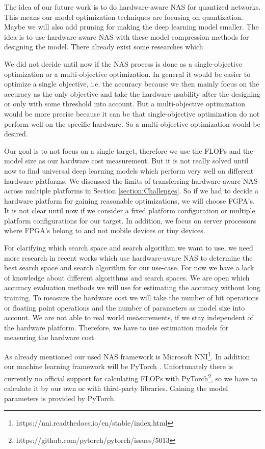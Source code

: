 \documentclass[conference]{IEEEtran}
\begin{document}
The idea of our future work is to do hardware-aware NAS for quantized networks. This means our model optimization techniques are focusing on quantization. Maybe we will also add pruning for making the deep learning model smaller. The idea is to use hardware-aware NAS with these model compression methods for designing the model. There already exist some researches which 

We did not decide until now if the NAS process is done as a single-objective optimization or a multi-objective optimization. In general it would be easier to optimize a single objective, i.e. the accuracy because we then mainly focus on the accuracy as the only objective and take the hardware usability after the designing or only with some threshold into account. But a multi-objective optimization would be more precise because it can be that single-objective optimization do not perform well on the specific hardware. So a multi-objective optimization would be desired.

Our goal is to not focus on a single target, therefore we use the FLOPs and the model size as our hardware cost measurement. But it is not really solved until now to find universal deep learning models which perform very well on different hardware platforms. We discussed the limits of transferring hardware-aware NAS across multiple platforms in Section \ref{section:Challenges}. So if we had to decide a hardware platform for gaining reasonable optimizations, we will choose FGPA's. It is not clear until now if we consider a fixed platform configuration or multiple platform configurations for our target. In addition, we focus on server processors where FPGA's belong to and not mobile devices or tiny devices. 

For clarifying which search space and search algorithm we want to use, we need more research in recent works which use hardware-aware NAS to determine the best search space and search algorithm for our use-case. For now we have a lack of knowledge about different algorithms and search spaces. We are open which accuracy evaluation methods we will use for estimating the accuracy without long training. To measure the hardware cost we will take the number of bit operations or floating point operations and the number of parameters as model size into account. We are not able to real world measurements, if we stay independent of the hardware platform. Therefore, we have to use estimation models for measuring the hardware cost. 

As already mentioned our used NAS framework is Microsoft NNI\footnote{https://nni.readthedocs.io/en/stable/index.html}. In addition our machine learning framework will be PyTorch \cite{bib4}. Unfortunately there is currently no official support for calculating FLOPs with PyTorch\footnote{https://github.com/pytorch/pytorch/issues/5013}, so we have to calculate it by our own or with third-party libraries. Gaining the model parameters is provided by PyTorch.
\end{document}
